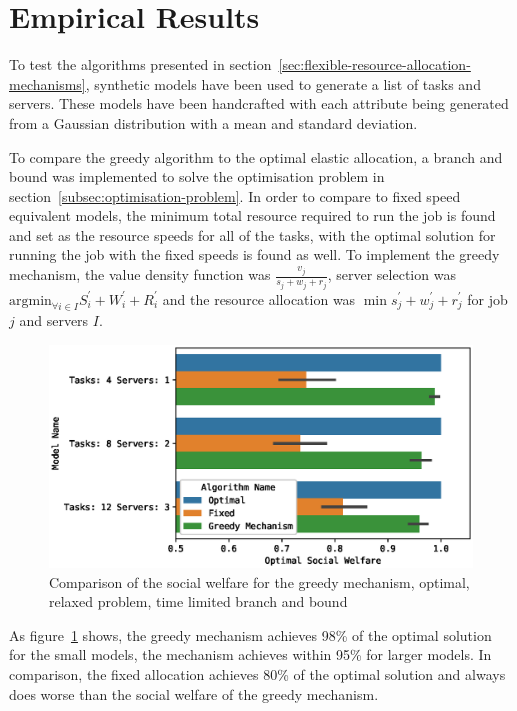 \section{Empirical Results}\label{sec:empirical-results}
To test the algorithms presented in section~\ref{sec:flexible-resource-allocation-mechanisms}, synthetic models have
been used to generate a list of tasks and servers. These models have been handcrafted with each attribute being
generated from a Gaussian distribution with a mean and standard deviation.

To compare the greedy algorithm to the optimal elastic allocation, a branch and bound was implemented to solve the
optimisation problem in section~\ref{subsec:optimisation-problem}. In order to compare to fixed speed equivalent models,
the minimum total resource required to run the job is found and set as the resource speeds for all of the tasks, with
the optimal solution for running the job with the fixed speeds is found as well. To implement the greedy mechanism, the
value density function was $\frac{v_j}{s_j + w_j + r_j}$, server selection was
$\text{argmin}_{\forall i \in I} S^{'}_i + W^{'}_i + R^{'}_i$ and the resource allocation was
$\min s^{'}_j + w^{'}_j + r^{'}_j$ for job $j$ and servers $I$.

\begin{figure}[h]
    \centering
    \includegraphics[width=\linewidth]{figs/empirical_evidence/greedy_mechanism}
    \caption{Comparison of the social welfare for the greedy mechanism, optimal, relaxed problem, time limited branch and bound}
    \label{fig:greedy-mechanism-comparison}
\end{figure}
As figure~\ref{fig:greedy-mechanism-comparison} shows, the greedy mechanism achieves 98\% of the optimal solution for
the small models, the mechanism achieves within 95\% for larger models. In comparison, the fixed allocation achieves
80\% of the optimal solution and always does worse than the social welfare of the greedy mechanism.

